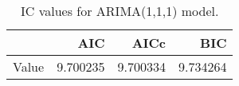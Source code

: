 \begin{table}[ht]
\centering
\begin{tabular}{rrrr}
  \hline
 & AIC & AICc & BIC \\ 
  \hline
Value & 9.700235 & 9.700334 & 9.734264 \\ 
   \hline
\end{tabular}
\caption{IC values for ARIMA(1,1,1) model.}
\end{table}